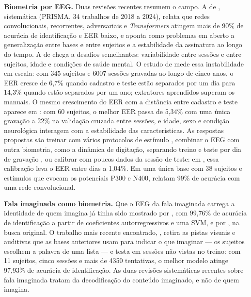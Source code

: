 			\par \textbf{Biometria por \ac{EEG}.} Duas revisões recentes resumem o campo. A de , sistemática (PRISMA, 34 trabalhos de 2018 a 2024), relata que redes convolucionais, recorrentes, adversariais e \textit{Transformers} atingem mais de 90\% de acurácia de identificação e \ac{EER} baixo, e aponta como problemas em aberto a generalização entre bases e entre sujeitos e a estabilidade da assinatura ao longo do tempo. A de  chega a desafios semelhantes: variabilidade entre sessões e entre sujeitos, idade e condições de saúde mental. O estudo de  mede essa instabilidade em escala: com 345 sujeitos e 6007 sessões gravadas ao longo de cinco anos, o \ac{EER} cresce de 6,7\% quando cadastro e teste estão separados por um dia para 14,3\% quando estão separados por um ano; extratores aprendidos superam os manuais. O mesmo crescimento do \ac{EER} com a distância entre cadastro e teste aparece em : com 60 sujeitos, o melhor \ac{EER} passa de 5,34\% com uma única gravação a 22\% na validação cruzada entre sessões, e idade, sexo e condição neurológica interagem com a estabilidade das características. As respostas propostas são treinar com vários protocolos de estímulo \cite{debie2022session}, combinar o \ac{EEG} com outra biometria, como a dinâmica de digitação, separando treino e teste por dia de gravação \cite{rahman2022robust}, ou calibrar com poucos dados da sessão de teste: em , essa calibração leva o \ac{EER} entre dias a 1,04\%. Em uma única base com 38 sujeitos e estímulos que evocam os potenciais P300 e N400,  relatam 99\% de acurácia com uma rede convolucional.

			\par \textbf{Fala imaginada como biometria.} Que o \ac{EEG} da fala imaginada carrega a identidade de quem imagina já tinha sido mostrado por , com 99,76\% de acurácia de identificação a partir de coeficientes autorregressivos e uma \ac{SVM}, e por , na busca original. O trabalho mais recente encontrado, \cite{derakhshesh2025cueless}, retira as pistas visuais e auditivas que as bases anteriores usam para indicar o que imaginar --- os sujeitos escolhem a palavra de uma lista --- e testa em sessões não vistas no treino: com 11 sujeitos, cinco sessões e mais de 4350 tentativas, o melhor modelo atinge 97,93\% de acurácia de identificação. As duas revisões sistemáticas recentes sobre fala imaginada \cite{alzahrani2024systematic,tates2025speech} tratam da decodificação do conteúdo imaginado, e não de quem imagina.

